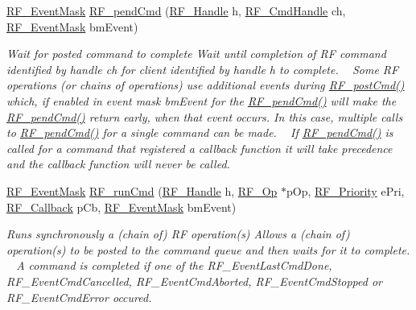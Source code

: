 \begin{DoxyCompactItemize}
\hyperlink{_r_f_8h_a128c46e18dbbaa781abb7abafc35233a}{R\+F\+\_\+\+Event\+Mask} \hyperlink{_r_f_8h_a91c1cb2508311f822acbc08ace568a83}{R\+F\+\_\+pend\+Cmd} (\hyperlink{_r_f_8h_a5e8ab7fc87fb818f435d9b6226ee573f}{R\+F\+\_\+\+Handle} h, \hyperlink{_r_f_8h_acab1f56c62a9fd1ad0a91a46b6da23f1}{R\+F\+\_\+\+Cmd\+Handle} ch, \hyperlink{_r_f_8h_a128c46e18dbbaa781abb7abafc35233a}{R\+F\+\_\+\+Event\+Mask} bm\+Event)
\begin{DoxyCompactList}\small\item\em Wait for posted command to complete Wait until completion of R\+F command identified by handle ch for client identified by handle h to complete. ~\newline
 Some R\+F operations (or chains of operations) use additional events during \hyperlink{_r_f_8h_a2b0ee444fcb74917df94eefea804ecbb}{R\+F\+\_\+post\+Cmd()} which, if enabled in event mask bm\+Event for the \hyperlink{_r_f_8h_a91c1cb2508311f822acbc08ace568a83}{R\+F\+\_\+pend\+Cmd()} will make the \hyperlink{_r_f_8h_a91c1cb2508311f822acbc08ace568a83}{R\+F\+\_\+pend\+Cmd()} return early, when that event occurs. In this case, multiple calls to \hyperlink{_r_f_8h_a91c1cb2508311f822acbc08ace568a83}{R\+F\+\_\+pend\+Cmd()} for a single command can be made. ~\newline
 If \hyperlink{_r_f_8h_a91c1cb2508311f822acbc08ace568a83}{R\+F\+\_\+pend\+Cmd()} is called for a command that registered a callback function it will take precedence and the callback function will never be called. ~\newline
 \end{DoxyCompactList}\item 
\hyperlink{_r_f_8h_a128c46e18dbbaa781abb7abafc35233a}{R\+F\+\_\+\+Event\+Mask} \hyperlink{_r_f_8h_a248bebdd1d0bd6e0812cf18116987e54}{R\+F\+\_\+run\+Cmd} (\hyperlink{_r_f_8h_a5e8ab7fc87fb818f435d9b6226ee573f}{R\+F\+\_\+\+Handle} h, \hyperlink{_r_f_8h_a47ea3dea78019340e8f8ceb854de5f02}{R\+F\+\_\+\+Op} $\ast$p\+Op, \hyperlink{_r_f_8h_ae5f9a893d178e64e6d0a7a783ea06e32}{R\+F\+\_\+\+Priority} e\+Pri, \hyperlink{_r_f_8h_a4d2ce6dc70b0f329dc5e249ec10c574a}{R\+F\+\_\+\+Callback} p\+Cb, \hyperlink{_r_f_8h_a128c46e18dbbaa781abb7abafc35233a}{R\+F\+\_\+\+Event\+Mask} bm\+Event)
\begin{DoxyCompactList}\small\item\em Runs synchronously a (chain of) R\+F operation(s) Allows a (chain of) operation(s) to be posted to the command queue and then waits for it to complete. ~\newline
 A command is completed if one of the R\+F\+\_\+\+Event\+Last\+Cmd\+Done, R\+F\+\_\+\+Event\+Cmd\+Cancelled, R\+F\+\_\+\+Event\+Cmd\+Aborted, R\+F\+\_\+\+Event\+Cmd\+Stopped or R\+F\+\_\+\+Event\+Cmd\+Error occured. \end{DoxyCompactList}\item 

\end{DoxyCompactItemize}
